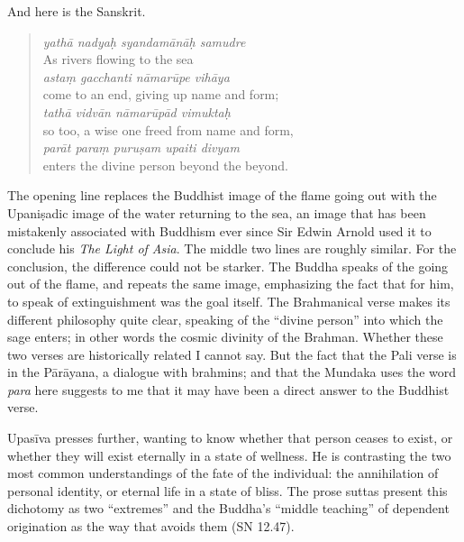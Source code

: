 \documentclass[12pt,openany]{book}%
\begin{document}
And here is the Sanskrit.

\begin{verse}%
\textit{\textsanskrit{yathā} nadyaḥ \textsanskrit{syandamānāḥ} samudre} \\
As rivers flowing to the sea \\
\textit{astaṃ gacchanti \textsanskrit{nāmarūpe} \textsanskrit{vihāya}} \\
come to an end, giving up name and form; \\
\textit{\textsanskrit{tathā} \textsanskrit{vidvān} \textsanskrit{nāmarūpād} vimuktaḥ} \\
so too, a wise one freed from name and form, \\
\textit{\textsanskrit{parāt} paraṃ \textsanskrit{puruṣam} upaiti divyam} \\
enters the divine person beyond the beyond.

%
\end{verse}

The opening line replaces the Buddhist image of the flame going out with the \textsanskrit{Upaniṣadic} image of the water returning to the sea, an image that has been mistakenly associated with Buddhism ever since Sir Edwin Arnold used it to conclude his \textit{The Light of Asia}. The middle two lines are roughly similar. For the conclusion, the difference could not be starker. The Buddha speaks of the going out of the flame, and repeats the same image, emphasizing the fact that for him, to speak of extinguishment was the goal itself. The Brahmanical verse makes its different philosophy quite clear, speaking of the “divine person” into which the sage enters; in other words the cosmic divinity of the Brahman. Whether these two verses are historically related I cannot say. But the fact that the Pali verse is in the \textsanskrit{Pārāyana}, a dialogue with brahmins; and that the Mundaka uses the word \textit{para} here suggests to me that it may have been a direct answer to the Buddhist verse.

\textsanskrit{Upasīva} presses further, wanting to know whether that person ceases to exist, or whether they will exist eternally in a state of wellness. He is contrasting the two most common understandings of the fate of the individual: the annihilation of personal identity, or eternal life in a state of bliss. The prose suttas present this dichotomy as two “extremes” and the Buddha’s “middle teaching” of dependent origination as the way that avoids them (SN 12.47).
\end{document}
